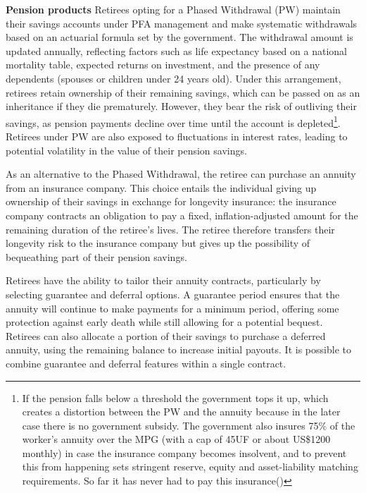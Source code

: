 \documentclass[12pt]{article}
\theoremstyle{plain}
\theoremstyle{plain}
\begin{document}
\textbf{Pension products} Retirees opting for a Phased Withdrawal (PW) maintain their savings accounts under PFA management and make systematic withdrawals based on an actuarial formula set by the government. The withdrawal amount is updated annually, reflecting factors such as life expectancy based on a national mortality table, expected returns on investment, and the presence of any dependents (spouses or children under 24 years old). Under this arrangement, retirees retain ownership of their remaining savings, which can be passed on as an inheritance if they die prematurely. However, they bear the risk of outliving their savings, as pension payments decline over time until the account is depleted\footnote{If the pension falls below a threshold the government tops it up, which creates a distortion between the PW and the annuity because in the later case there is no government subsidy. The government also insures 75\% of the worker’s annuity over the MPG (with a cap of 45UF or about US\$1200 monthly) in case the insurance company becomes insolvent, and to prevent this from happening sets stringent reserve, equity and asset-liability matching requirements. So far it has never had to pay this insurance(\cite{james_pensiones_2005})}. Retirees under PW are also exposed to fluctuations in interest rates, leading to potential volatility in the value of their pension savings.

As an alternative to the Phased Withdrawal, the retiree can purchase an annuity from an insurance company. This choice entails the individual giving up ownership of their savings in exchange for longevity insurance: the insurance company contracts an obligation to pay a fixed, inflation-adjusted amount for the remaining duration of the retiree’s lives. The retiree therefore transfers their longevity risk to the insurance company but gives up the possibility of bequeathing part of their pension savings.

Retirees have the ability to tailor their annuity contracts, particularly by selecting guarantee and deferral options. A guarantee period ensures that the annuity will continue to make payments for a minimum period, offering some protection against early death while still allowing for a potential bequest. Retirees can also allocate a portion of their savings to purchase a deferred annuity, using the remaining balance to increase initial payouts. It is possible to combine guarantee and deferral features within a single contract.
\end{document}
